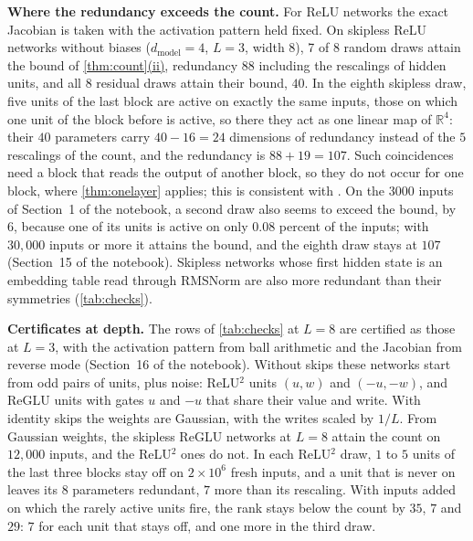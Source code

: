 \documentclass[10pt]{article}
\theoremstyle{definition}
\theoremstyle{remark}
\newcommand{\R}{\mathbb{R}}
\newcommand{\dm}{d_{\mathrm{model}}}
\newcommand{\para}[1]{\smallskip\noindent\textbf{#1}\hspace{0.5em}}
\DeclareRobustCommand{\cpref}[2]{\hyperref[#1:#2]{\cref*{#1}(#2)}}
\begin{document}
\para{Where the redundancy exceeds the count.} For ReLU networks the exact Jacobian is taken with the activation pattern held fixed. On skipless ReLU networks without biases ($\dm = 4$, $L = 3$, width $8$), 7 of 8 random draws attain the bound of \cpref{thm:count}{ii}, redundancy $88$ including the rescalings of hidden units, and all 8 residual draws attain their bound, $40$. In the eighth skipless draw, five units of the last block are active on exactly the same inputs, those on which one unit of the block before is active, so there they act as one linear map of $\R^4$: their $40$ parameters carry $40 - 16 = 24$ dimensions of redundancy instead of the $5$ rescalings of the count, and the redundancy is $88 + 19 = 107$. Such coincidences need a block that reads the output of another block, so they do not occur for one block, where \cref{thm:onelayer} applies; this is consistent with \citet{grigsby2023hidden}. On the 3000 inputs of Section~1 of the notebook, a second draw also seems to exceed the bound, by 6, because one of its units is active on only $0.08$ percent of the inputs; with $30{,}000$ inputs or more it attains the bound, and the eighth draw stays at $107$ (Section~15 of the notebook). Skipless networks whose first hidden state is an embedding table read through RMSNorm are also more redundant than their symmetries (\cref{tab:checks}).

\para{Certificates at depth.} The rows of \cref{tab:checks} at $L = 8$ are certified as those at $L = 3$, with the activation pattern from ball arithmetic and the Jacobian from reverse mode (Section~16 of the notebook). Without skips these networks start from odd pairs of units, plus noise: ReLU$^2$ units $(u, w)$ and $(-u, -w)$, and ReGLU units with gates $u$ and $-u$ that share their value and write. With identity skips the weights are Gaussian, with the writes scaled by $1/L$. From Gaussian weights, the skipless ReGLU networks at $L = 8$ attain the count on $12{,}000$ inputs, and the ReLU$^2$ ones do not. In each ReLU$^2$ draw, $1$ to $5$ units of the last three blocks stay off on $2\times10^6$ fresh inputs, and a unit that is never on leaves its $8$ parameters redundant, $7$ more than its rescaling. With inputs added on which the rarely active units fire, the rank stays below the count by $35$, $7$ and $29$: $7$ for each unit that stays off, and one more in the third draw.
\end{document}
